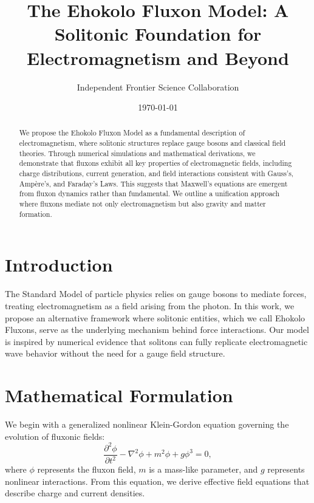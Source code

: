\documentclass{article}
\title{The Ehokolo Fluxon Model: A Solitonic Foundation for Electromagnetism and Beyond}
\author{Independent Frontier Science Collaboration}
\date{\today}
\begin{document}
\maketitle

\begin{abstract}
We propose the Ehokolo Fluxon Model as a fundamental description of electromagnetism, where solitonic structures replace gauge bosons and classical field theories. Through numerical simulations and mathematical derivations, we demonstrate that fluxons exhibit all key properties of electromagnetic fields, including charge distributions, current generation, and field interactions consistent with Gauss’s, Ampère’s, and Faraday’s Laws. This suggests that Maxwell’s equations are emergent from fluxon dynamics rather than fundamental. We outline a unification approach where fluxons mediate not only electromagnetism but also gravity and matter formation.
\end{abstract}

\section{Introduction}
The Standard Model of particle physics relies on gauge bosons to mediate forces, treating electromagnetism as a field arising from the photon. In this work, we propose an alternative framework where solitonic entities, which we call Ehokolo Fluxons, serve as the underlying mechanism behind force interactions. Our model is inspired by numerical evidence that solitons can fully replicate electromagnetic wave behavior without the need for a gauge field structure.

\section{Mathematical Formulation}
We begin with a generalized nonlinear Klein-Gordon equation governing the evolution of fluxonic fields:
\begin{equation}
\frac{\partial^2 \phi}{\partial t^2} - \nabla^2 \phi + m^2 \phi + g \phi^3 = 0,
\end{equation}
where $\phi$ represents the fluxon field, $m$ is a mass-like parameter, and $g$ represents nonlinear interactions. From this equation, we derive effective field equations that describe charge and current densities.
\end{document}
